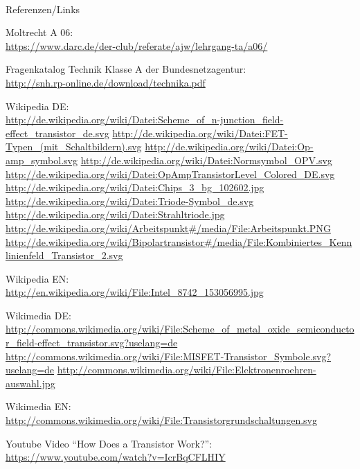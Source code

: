 \renewcommand{\refname}{Referenzen}

\hypertarget{refs}{}
\textcolor{white}{} \\ %
\Large Referenzen/Links
\footnotesize

\begin{thebibliography}{}
     Moltrecht A 06: \\
    \url{https://www.darc.de/der-club/referate/ajw/lehrgang-ta/a06/}

   Fragenkatalog Technik Klasse A der Bundesnetzagentur:\\
    \url{http://snh.rp-online.de/download/technika.pdf}

      Wikipedia DE: \\
    \url{http://de.wikipedia.org/wiki/Datei:Scheme_of_n-junction_field-effect_transistor_de.svg}
    \url{http://de.wikipedia.org/wiki/Datei:FET-Typen_(mit_Schaltbildern).svg}
    \url{http://de.wikipedia.org/wiki/Datei:Op-amp_symbol.svg}
    \url{http://de.wikipedia.org/wiki/Datei:Normsymbol_OPV.svg}
    \url{http://de.wikipedia.org/wiki/Datei:OpAmpTransistorLevel_Colored_DE.svg}
    \url{http://de.wikipedia.org/wiki/Datei:Chips_3_bg_102602.jpg}
    \url{http://de.wikipedia.org/wiki/Datei:Triode-Symbol_de.svg}
    \url{http://de.wikipedia.org/wiki/Datei:Strahltriode.jpg}
    \url{http://de.wikipedia.org/wiki/Arbeitspunkt#/media/File:Arbeitspunkt.PNG}
    \url{http://de.wikipedia.org/wiki/Bipolartransistor#/media/File:Kombiniertes_Kennlinienfeld_Transistor_2.svg}

   Wikipedia EN:\\
    \url{http://en.wikipedia.org/wiki/File:Intel_8742_153056995.jpg}

   Wikimedia DE:\\
    \url{http://commons.wikimedia.org/wiki/File:Scheme_of_metal_oxide_semiconductor_field-effect_transistor.svg?uselang=de}
    \url{http://commons.wikimedia.org/wiki/File:MISFET-Transistor_Symbole.svg?uselang=de}
    \url{http://commons.wikimedia.org/wiki/File:Elektronenroehren-auswahl.jpg}

   Wikimedia EN:\\
    \url{http://commons.wikimedia.org/wiki/File:Transistorgrundschaltungen.svg}\

      Youtube Video “How Does a Transistor Work?”:
    \url{https://www.youtube.com/watch?v=IcrBqCFLHIY}
\end{thebibliography}


